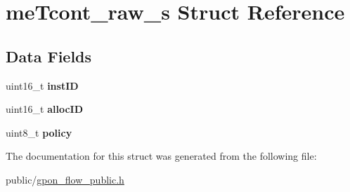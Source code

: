 \hypertarget{structmeTcont__raw__s}{}\section{me\+Tcont\+\_\+raw\+\_\+s Struct Reference}
\label{structmeTcont__raw__s}
\subsection*{Data Fields}
\begin{DoxyCompactItemize}
\item 
\mbox{\label{structmeTcont__raw__s_a49f0d07e4a9ec9af334999879d3b6f63}} 
uint16\+\_\+t {\bfseries inst\+ID}
\item 
\mbox{\label{structmeTcont__raw__s_adb3eb24d6741a16cb876e93d44b8a276}} 
uint16\+\_\+t {\bfseries alloc\+ID}
\item 
\mbox{\label{structmeTcont__raw__s_ae751d43179767e06b00ddda744b2ef02}} 
uint8\+\_\+t {\bfseries policy}
\end{DoxyCompactItemize}


The documentation for this struct was generated from the following file\+:\begin{DoxyCompactItemize}
\item 
public/\hyperlink{gpon__flow__public_8h}{gpon\+\_\+flow\+\_\+public.\+h}\end{DoxyCompactItemize}

